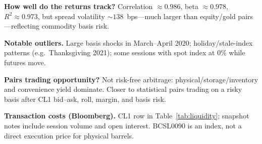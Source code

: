 \documentclass[11pt]{article}
\begin{document}
\textbf{How well do the returns track?}
Correlation $\approx 0.986$, beta $\approx 0.978$, $R^2 \approx 0.973$, but spread volatility $\sim 138$~bps---much larger than equity/gold pairs---reflecting commodity basis risk.

\textbf{Notable outliers.}
Large basis shocks in March--April 2020; holiday/stale-index patterns (e.g.\ Thanksgiving 2021); some sessions with spot index at 0\% while futures move.

\textbf{Pairs trading opportunity?}
Not risk-free arbitrage: physical/storage/inventory and convenience yield dominate. Closer to statistical pairs trading on a risky basis after CL1 bid--ask, roll, margin, and basis risk.

\textbf{Transaction costs (Bloomberg).}
CL1 row in Table~\ref{tab:liquidity}; snapshot notes include session volume and open interest. BCSL0090 is an index, not a direct execution price for physical barrels.
\end{document}
